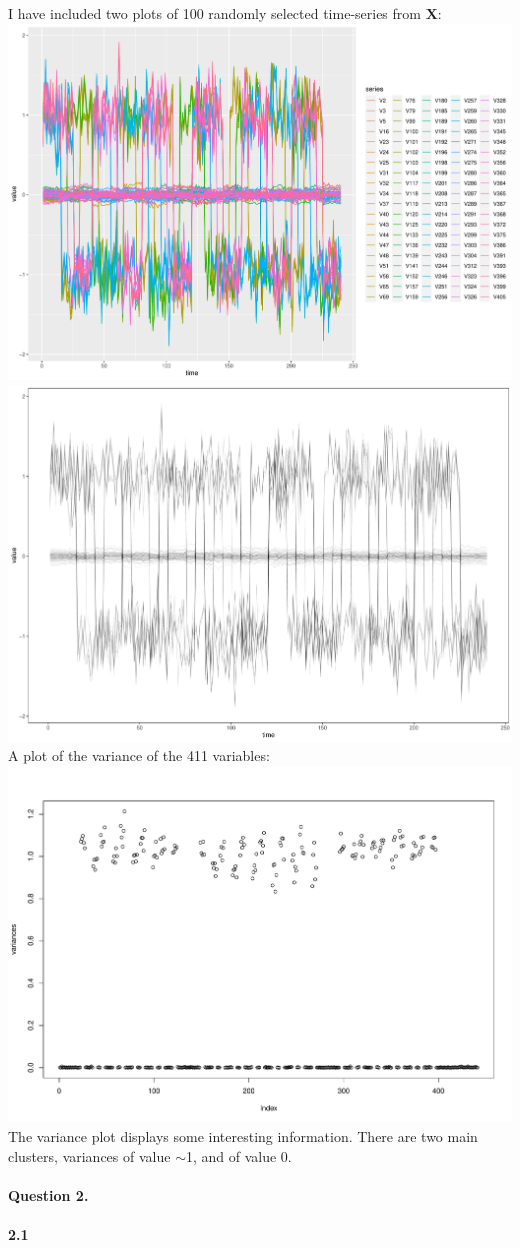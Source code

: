 \documentclass[11pt]{article}
\begin{document}
I have included two plots of 100 randomly selected time-series from $\textbf{X}$:\\
\includegraphics[width=.75\linewidth]{plots/wild_15plot.pdf}\\
\includegraphics[width=.55\linewidth]{plots/15plot.pdf}\\
A plot of the variance of the 411 variables:\\
\includegraphics[width=.55\linewidth]{plots/variance_plot15.pdf}\\
The variance plot displays some interesting information. There are two main clusters, variances of value $\sim$1, and of value 0.\\\\
\textbf{Question 2.}\\\\
\textbf{2.1}\\
\end{document}
